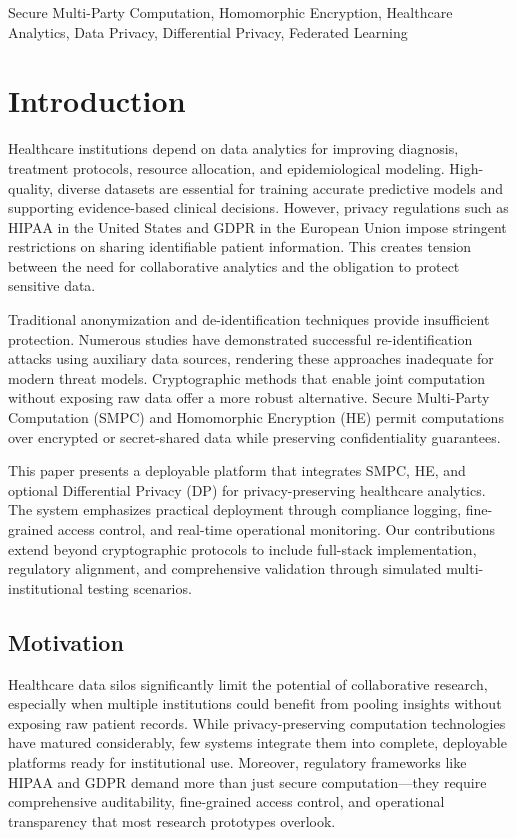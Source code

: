 \documentclass[conference]{IEEEtran}
\begin{document}
\begin{IEEEkeywords}
Secure Multi-Party Computation, Homomorphic Encryption, Healthcare Analytics, Data Privacy, Differential Privacy, Federated Learning
\end{IEEEkeywords}

\section{Introduction}
Healthcare institutions depend on data analytics for improving diagnosis, treatment protocols, resource allocation, and epidemiological modeling. High-quality, diverse datasets are essential for training accurate predictive models and supporting evidence-based clinical decisions. However, privacy regulations such as HIPAA in the United States and GDPR in the European Union impose stringent restrictions on sharing identifiable patient information. This creates tension between the need for collaborative analytics and the obligation to protect sensitive data.

Traditional anonymization and de-identification techniques provide insufficient protection. Numerous studies have demonstrated successful re-identification attacks using auxiliary data sources, rendering these approaches inadequate for modern threat models. Cryptographic methods that enable joint computation without exposing raw data offer a more robust alternative. Secure Multi-Party Computation (SMPC) and Homomorphic Encryption (HE) permit computations over encrypted or secret-shared data while preserving confidentiality guarantees.

This paper presents a deployable platform that integrates SMPC, HE, and optional Differential Privacy (DP) for privacy-preserving healthcare analytics. The system emphasizes practical deployment through compliance logging, fine-grained access control, and real-time operational monitoring. Our contributions extend beyond cryptographic protocols to include full-stack implementation, regulatory alignment, and comprehensive validation through simulated multi-institutional testing scenarios.

\subsection{Motivation}
Healthcare data silos significantly limit the potential of collaborative research, especially when multiple institutions could benefit from pooling insights without exposing raw patient records. While privacy-preserving computation technologies have matured considerably, few systems integrate them into complete, deployable platforms ready for institutional use. Moreover, regulatory frameworks like HIPAA and GDPR demand more than just secure computation—they require comprehensive auditability, fine-grained access control, and operational transparency that most research prototypes overlook.
\end{document}
